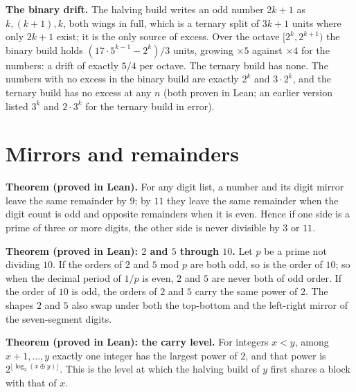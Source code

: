 \documentclass[11pt]{article}
\begin{document}
\textbf{The binary drift.} The halving build writes an odd number $2k+1$ as $k,(k{+}1),k$, both wings in full, which is a ternary split of $3k+1$ units where only $2k+1$ exist; it is the only source of excess. Over the octave $[2^k, 2^{k+1})$ the binary build holds $(17\cdot5^{k-1} - 2^k)/3$ units, growing $\times5$ against $\times4$ for the numbers: a drift of exactly $5/4$ per octave. The ternary build has none. The numbers with no excess in the binary build are exactly $2^k$ and $3\cdot2^k$, and the ternary build has no excess at any $n$ (both proven in Lean; an earlier version listed $3^k$ and $2\cdot3^k$ for the ternary build in error).

\section{Mirrors and remainders}
\textbf{Theorem (proved in Lean).} For any digit list, a number and its digit mirror leave the same remainder by $9$; by $11$ they leave the same remainder when the digit count is odd and opposite remainders when it is even. Hence if one side is a prime of three or more digits, the other side is never divisible by $3$ or $11$.

\textbf{Theorem (proved in Lean): $2$ and $5$ through $10$.} Let $p$ be a prime not dividing $10$. If the orders of $2$ and $5$ mod $p$ are both odd, so is the order of $10$; so when the decimal period of $1/p$ is even, $2$ and $5$ are never both of odd order. If the order of $10$ is odd, the orders of $2$ and $5$ carry the same power of $2$. The shapes $2$ and $5$ also swap under both the top-bottom and the left-right mirror of the seven-segment digits.

\textbf{Theorem (proved in Lean): the carry level.} For integers $x<y$, among $x{+}1,\dots,y$ exactly one integer has the largest power of $2$, and that power is $2^{\lfloor\log_2(x \oplus y)\rfloor}$. This is the level at which the halving build of $y$ first shares a block with that of $x$.
\end{document}
